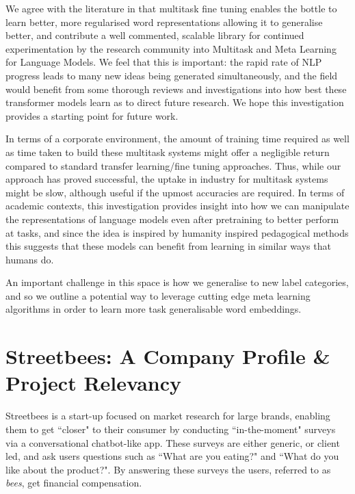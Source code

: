 \documentclass[11pt]{report}
\def \thesistitle {Multitask \& Meta Learning for Language Models}
\renewcommand{\headrulewidth}{0.4pt}
\theoremstyle{Definition}
\theoremstyle{remark}
\begin{document}
We agree with the literature in that multitask fine tuning enables the bottle to learn better, more regularised word representations allowing it to generalise better, and contribute a well commented, scalable library for continued experimentation by the research community into Multitask and Meta Learning for Language Models. We feel that this is important: the rapid rate of NLP progress leads to many new ideas being generated simultaneously, and the field would benefit from some thorough reviews and investigations into how best these transformer models learn as to direct future research. We hope this investigation provides a starting point for future work.

In terms of a corporate environment, the amount of training time required as well as time taken to build these multitask systems might offer a negligible return compared to standard transfer learning/fine tuning approaches. Thus, while our approach has proved successful, the uptake in industry for multitask systems might be slow, although useful if the upmost accuracies are required. In terms of academic contexts, this investigation provides insight into how we can manipulate the representations of language models even after pretraining to better perform at tasks, and since the idea is inspired by humanity inspired pedagogical methods this suggests that these models can benefit from learning in similar ways that humans do.

An important challenge in this space is how we generalise to new label categories, and so we outline a potential way to leverage cutting edge meta learning algorithms in order to learn more task generalisable word embeddings.

\appendix
\chapter{Streetbees: A Company Profile \& Project Relevancy}
\label{appendix:streetbees}
\fancyhf{}
\fancyhead[R]{\slshape\nouppercase{\thesistitle}}
\renewcommand{\headrulewidth}{0.4pt}
\fancyfoot[C]{\thepage}
Streetbees is a start-up focused on market research for large brands, enabling them to get ``closer" to their consumer by conducting ``in-the-moment" surveys via a conversational chatbot-like app. These surveys are either generic, or client led, and ask users questions such as ``What are you eating?" and ``What do you like about the product?". By answering these surveys the users, referred to as \textit{bees}, get financial compensation. 
\end{document}
